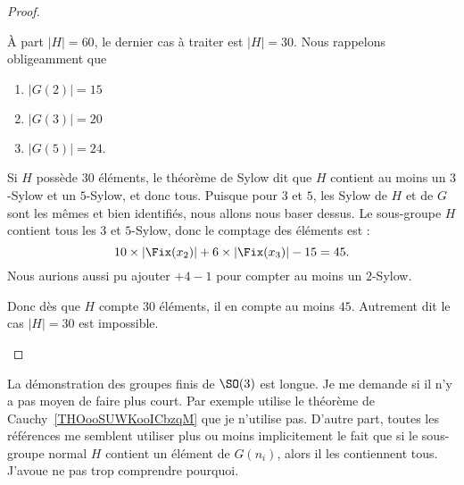 \begin{proof}
\begin{subproof}
		\spitem[Si \( | H |=30\)]
		À part \( | H |=60\), le dernier cas à traiter est \( | H |=30\). Nous rappelons obligeamment que
		\begin{enumerate}
			\item
			      \( | G(2) |=15\)
			\item
			      \( | G(3) |=20\)
			\item
			      \( | G(5) |=24\).
		\end{enumerate}
		Si \( H\) possède \( 30\) éléments, le théorème de Sylow dit que \( H\) contient au moins un \( 3\)-Sylow et un \( 5\)-Sylow, et donc tous. Puisque pour \( 3\) et \( 5\), les Sylow de \( H\) et de \( G\) sont les mêmes et bien identifiés, nous allons nous baser dessus. Le sous-groupe \( H\) contient tous les \( 3\) et \( 5\)-Sylow, donc le comptage des éléments est :
		\begin{equation}
			10\times | \Fix(x_2) |+6\times | \Fix(x_3) |-15=45.
		\end{equation}
		Nous aurions aussi pu ajouter \( +4-1\) pour compter au moins un \( 2\)-Sylow.

		Donc dès que \( H\) compte \( 30\) éléments, il en compte au moins \( 45\). Autrement dit le cas \( | H |=30\) est impossible.
	\end{subproof}
\end{proof}

\begin{probleme}
	La démonstration des groupes finis de \( \SO(3)\) est longue. Je me demande si il n'y a pas moyen de faire plus court. Par exemple \cite{ooYODPooHeNKiQ} utilise le théorème de Cauchy~\ref{THOooSUWKooICbzqM} que je n'utilise pas. D'autre part, toutes les références me semblent utiliser plus ou moins implicitement le fait que si le sous-groupe normal \( H\) contient un élément de \( G(n_i)\), alors il les contiennent tous. J'avoue ne pas trop comprendre pourquoi.
\end{probleme}
